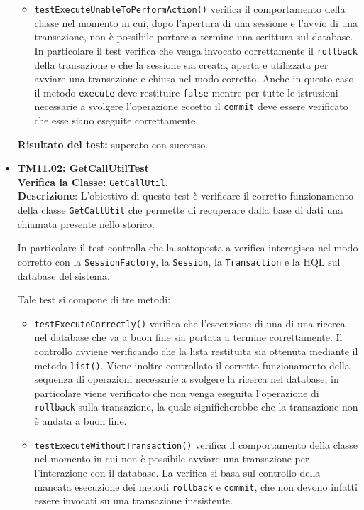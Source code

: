 \begin{itemize}
\begin{itemize}
\item \texttt{testExecuteUnableToPerformAction()} verifica il comportamento della classe nel momento in cui, dopo l'apertura di una sessione e l'avvio di una transazione, non è possibile portare a termine una scrittura sul database. In particolare il test verifica che venga invocato correttamente il \texttt{rollback} della transazione e che la sessione sia creata, aperta e utilizzata per avviare una transazione e chiusa nel modo corretto. Anche in questo caso il metodo \texttt{execute} deve restituire \texttt{false} mentre per tutte le istruzioni necessarie a svolgere l'operazione eccetto il \texttt{commit} deve essere verificato che esse siano eseguite correttamente.

\end{itemize}
\textbf{Risultato del test:} superato con successo.

\item[\passed] \textbf{TM11.02: GetCallUtilTest}\\
\textbf{Verifica la Classe:} \texttt{GetCallUtil}.\\
\textbf{Descrizione}: L'obiettivo di questo test è verificare il corretto funzionamento della classe \texttt{GetCallUtil} che permette di recuperare dalla base di dati una chiamata presente nello storico.

In particolare il test controlla che la  sottoposta a verifica interagisca nel modo corretto con la \texttt{SessionFactory}, la \texttt{Session}, la \texttt{Transaction} e la  HQL sul database del sistema.

Tale test si compone di tre metodi:
\begin{itemize}
\item \texttt{testExecuteCorrectly()} verifica che l'esecuzione di una di una ricerca nel database che va a buon fine  sia portata a termine correttamente. 
Il controllo avviene verificando che la lista restituita sia ottenuta mediante il metodo \texttt{list()}. 
Viene inoltre controllato il corretto funzionamento della sequenza di operazioni necessarie a svolgere la ricerca nel database, in particolare viene verificato che non venga eseguita l'operazione di \texttt{rollback} sulla transazione, la quale significherebbe che la transazione non è andata a buon fine.

\item \texttt{testExecuteWithoutTransaction()}
verifica il comportamento della classe nel momento in cui non è possibile avviare una transazione per l'interazione con il database.
La verifica si basa sul controllo della mancata esecuzione dei metodi \texttt{rollback} e \texttt{commit}, che non devono infatti essere invocati su una transazione inesistente.


\end{itemize}
\end{itemize}
